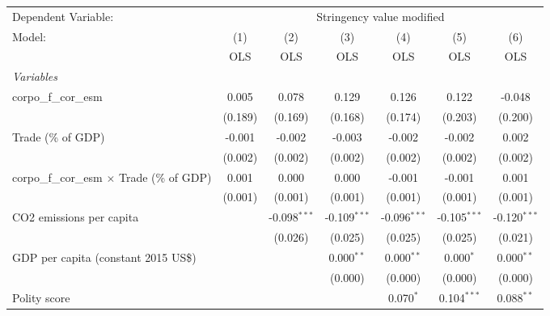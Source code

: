 
\begingroup
\centering
\begin{tabular}{lcccccc}
   \toprule
   Dependent Variable: & \multicolumn{6}{c}{Stringency value modified}\\
   Model:                                             & (1)     & (2)            & (3)            & (4)            & (5)            & (6)\\  
                                                      &  OLS    & OLS            & OLS            & OLS            & OLS            & OLS\\  
   \midrule
   \emph{Variables}\\
   corpo\_f\_cor\_esm                                 & 0.005   & 0.078          & 0.129          & 0.126          & 0.122          & -0.048\\   
                                                      & (0.189) & (0.169)        & (0.168)        & (0.174)        & (0.203)        & (0.200)\\   
   Trade (\% of GDP)                                  & -0.001  & -0.002         & -0.003         & -0.002         & -0.002         & 0.002\\   
                                                      & (0.002) & (0.002)        & (0.002)        & (0.002)        & (0.002)        & (0.002)\\   
   corpo\_f\_cor\_esm $\times$ Trade (\% of GDP)      & 0.001   & 0.000          & 0.000          & -0.001         & -0.001         & 0.001\\   
                                                      & (0.001) & (0.001)        & (0.001)        & (0.001)        & (0.001)        & (0.001)\\   
   CO2 emissions per capita                           &         & -0.098$^{***}$ & -0.109$^{***}$ & -0.096$^{***}$ & -0.105$^{***}$ & -0.120$^{***}$\\   
                                                      &         & (0.026)        & (0.025)        & (0.025)        & (0.025)        & (0.021)\\   
   GDP per capita (constant 2015 US\$)                &         &                & 0.000$^{**}$   & 0.000$^{**}$   & 0.000$^{*}$    & 0.000$^{**}$\\   
                                                      &         &                & (0.000)        & (0.000)        & (0.000)        & (0.000)\\   
   Polity score                                       &         &                &                & 0.070$^{*}$    & 0.104$^{***}$  & 0.088$^{**}$\\   

\end{tabular}
